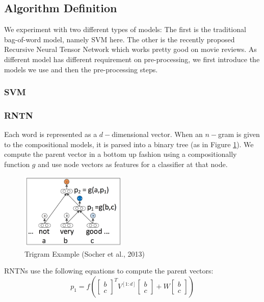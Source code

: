 \subsection{Algorithm Definition}
We experiment with two different types of models: The first is the traditional bag-of-word model, namely SVM here. The other is the recently proposed Recursive Neural Tensor Network which works pretty good on movie reviews. As different model has different requirement on pre-processing, we first introduce the models we use and then the pre-processing steps. 


\subsubsection{SVM}

\subsubsection{RNTN}
Each word is represented as a $d-$dimensional vector. When an $n-$gram is given to the compositional models, it is parsed into a binary tree (as in Figure \ref{trigram}). We compute the parent vector in a bottom up fashion using a compositionally function $g$ and use node vectors as features for a classifier at that node. 
\begin{figure}[H]
\begin{center}
\includegraphics[width = 0.45\textwidth]{pic/trigram.png}
\caption{\label{trigram}Trigram Example (Socher et al., 2013) }
\end{center}
\end{figure}

RNTNs use the following equations to compute the parent vectors: 
\begin{equation*}
p_1 = f \left(  
\begin{bmatrix}
b \\ c
\end{bmatrix}^T
V^{[1:d]} 
\begin{bmatrix}
b \\ c
\end{bmatrix}
+ W
\begin{bmatrix}
b \\ c
\end{bmatrix}
 \right)
\end{equation*}
 
